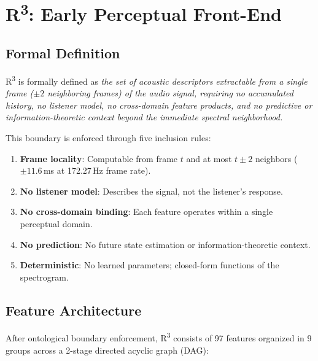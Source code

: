 \documentclass[10pt,twocolumn]{article}
\newcommand{\Rcube}{R\textsuperscript{3}}
\begin{document}
\section{R\textsuperscript{3}: Early Perceptual Front-End}
\label{sec:r3}

\subsection{Formal Definition}

\Rcube{} is formally defined as \emph{the set of acoustic descriptors extractable from a single frame ($\pm 2$ neighboring frames) of the audio signal, requiring no accumulated history, no listener model, no cross-domain feature products, and no predictive or information-theoretic context beyond the immediate spectral neighborhood.}

This boundary is enforced through five inclusion rules:
\begin{enumerate}[leftmargin=*,nosep]
    \item \textbf{Frame locality}: Computable from frame $t$ and at most $t \pm 2$ neighbors ($\pm 11.6$\,ms at 172.27\,Hz frame rate).
    \item \textbf{No listener model}: Describes the signal, not the listener's response.
    \item \textbf{No cross-domain binding}: Each feature operates within a single perceptual domain.
    \item \textbf{No prediction}: No future state estimation or information-theoretic context.
    \item \textbf{Deterministic}: No learned parameters; closed-form functions of the spectrogram.
\end{enumerate}

\subsection{Feature Architecture}

After ontological boundary enforcement, \Rcube{} consists of 97 features organized in 9 groups across a 2-stage directed acyclic graph (DAG):
\end{document}

